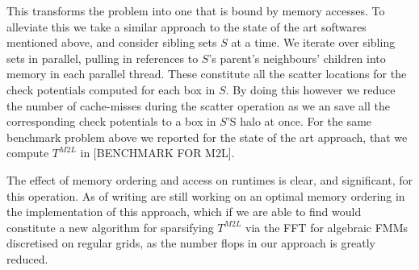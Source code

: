 This transforms the problem into one that is bound by memory accesses. To alleviate this we take a similar approach to the state of the art softwares mentioned above, and consider sibling sets $S$ at a time. We iterate over sibling sets in parallel, pulling in references to $S$'s parent's neighbours' children into memory in each parallel thread. These constitute all the scatter locations for the check potentials computed for each box in $S$. By doing this however we reduce the number of cache-misses during the scatter operation as we an save all the corresponding check potentials to a box in $S$'S halo at once. For the same benchmark problem above we reported for the state of the art approach, that we compute $T^{M2L}$ in [BENCHMARK FOR M2L].

The effect of memory ordering and access on runtimes is clear, and significant, for this operation. As of writing are still working on an optimal memory ordering in the implementation of this approach, which if we are able to find would constitute a new algorithm for sparsifying $T^{M2L}$ via the FFT for algebraic FMMs discretised on regular grids, as the number flops in our approach is greatly reduced.
